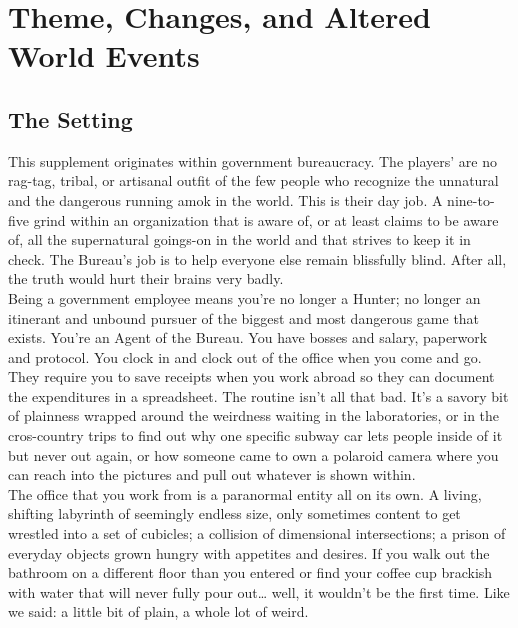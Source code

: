 \documentclass[10pt,oneside,landscape]{memoir}
\begin{document}
\chapter*{Theme, Changes, and Altered World Events}
\begin{multicols}{2}

\section*{The Setting}
This supplement originates within government bureaucracy.  The players’ are no rag-tag, tribal, or artisanal outfit of the few people who recognize the unnatural and the dangerous running amok in the world.  This is their day job.  A nine-to-five grind within an organization that is aware of, or at least claims to be aware of, all the supernatural goings-on in the world and that strives to keep it in check.  The Bureau’s job is to help everyone else remain blissfully blind.  After all, the truth would hurt their brains very badly.
\\[4mm]
Being a government employee means you’re no longer a Hunter; no longer an itinerant and unbound pursuer of the biggest and most dangerous game that exists.  You’re an Agent of the Bureau.  You have bosses and salary, paperwork and protocol.  You clock in and clock out of the office when you come and go.  They require you to save receipts when you work abroad so they can document the expenditures in a spreadsheet.  The routine isn’t all that bad.  It’s a savory bit of plainness wrapped around the weirdness waiting in the laboratories, or in the cros-country trips to find out why one specific subway car lets people inside of it but never out again, or how someone came to own a polaroid camera where you can reach into the pictures and pull out whatever is shown within.
\\[4mm]
The office that you work from is a paranormal entity all on its own.  A living, shifting labyrinth of seemingly endless size, only sometimes content to get wrestled into a set of cubicles; a collision of dimensional intersections; a prison of everyday objects grown hungry with appetites and desires.  If you walk out the bathroom on a different floor than you entered or find your coffee cup brackish with water that will never fully pour out… well, it wouldn’t be the first time.  Like we said: a little bit of plain, a whole lot of weird.


\end{multicols}
\end{document}
